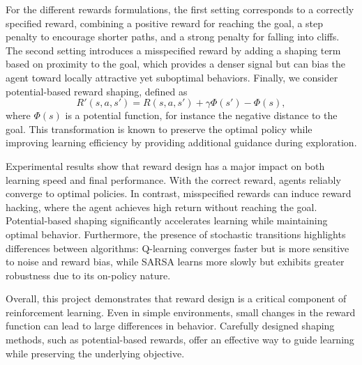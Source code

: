\documentclass[10pt]{article}
\begin{document}
\medskip

For the different rewards formulations, the first setting corresponds to a correctly specified reward, combining a positive reward for reaching the goal, a step penalty to encourage shorter paths, and a strong penalty for falling into cliffs. The second setting introduces a misspecified reward by adding a shaping term based on proximity to the goal, which provides a denser signal but can bias the agent toward locally attractive yet suboptimal behaviors. Finally, we consider potential-based reward shaping, defined as
\[
	R'(s,a,s') = R(s,a,s') + \gamma \Phi(s') - \Phi(s),
\]
where $\Phi(s)$ is a potential function, for instance the negative distance to the goal. This transformation is known to preserve the optimal policy while improving learning efficiency by providing additional guidance during exploration.

\medskip

Experimental results show that reward design has a major impact on both learning speed and final performance. With the correct reward, agents reliably converge to optimal policies. In contrast, misspecified rewards can induce reward hacking, where the agent achieves high return without reaching the goal. Potential-based shaping significantly accelerates learning while maintaining optimal behavior. Furthermore, the presence of stochastic transitions highlights differences between algorithms: Q-learning converges faster but is more sensitive to noise and reward bias, while SARSA learns more slowly but exhibits greater robustness due to its on-policy nature.

\medskip

Overall, this project demonstrates that reward design is a critical component of reinforcement learning. Even in simple environments, small changes in the reward function can lead to large differences in behavior. Carefully designed shaping methods, such as potential-based rewards, offer an effective way to guide learning while preserving the underlying objective.
\end{document}
